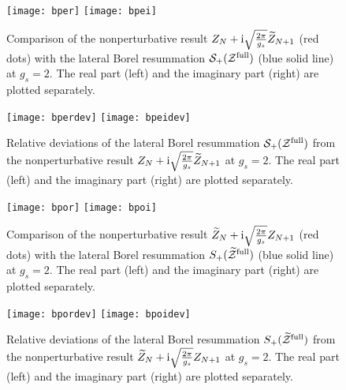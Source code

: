\documentclass[11pt]{article}
\newcommand{\ri}{{\rm i}}
\renewcommand{\[}{\begin{eqnarray}}
\renewcommand{\]}{\end{eqnarray}}
\newcommand{\tZ}{{\widetilde Z}}
\newcommand{\Zefull}{{\cal Z}^{\text{full}}}
\newcommand{\Zofull}{{\widetilde{\cal Z}}^{\text{full}}}
\begin{document}
\begin{figure}[tb]
\begin{center}
\texttt{[image: bper]}
\hspace{1cm}
\texttt{[image: bpei]}
\end{center}
\vspace{-2ex}
\caption{Comparison of the nonperturbative result
$Z_N+\ri\sqrt{\frac{2\pi}{g_s}}\tZ_{N+1}$ (red dots)
with the lateral Borel resummation
$\mathcal{S}_+(\Zefull)$ (blue solid line)
at $g_s=2$.
The real part (left) and the imaginary part (right)
are plotted separately.}
\label{fig:bpe}
\end{figure}
%
%
\begin{figure}[tb]
\vspace{2ex}
\begin{center}
\texttt{[image: bperdev]}
\hspace{1cm}
\texttt{[image: bpeidev]}
\end{center}
\vspace{-2ex}
\caption{Relative deviations of
the lateral Borel resummation
$\mathcal{S}_+(\Zefull)$
from the nonperturbative result
$Z_N+\ri\sqrt{\frac{2\pi}{g_s}}\tZ_{N+1}$
at $g_s=2$.
The real part (left) and the imaginary part (right)
are plotted separately.}
\label{fig:bpedev}
\end{figure}
%
%
\begin{figure}[tb]
\begin{center}
\texttt{[image: bpor]}
\hspace{1cm}
\texttt{[image: bpoi]}
\end{center}
\vspace{-2ex}
\caption{Comparison of the nonperturbative result
$\tZ_N+\ri\sqrt{\frac{2\pi}{g_s}}Z_{N+1}$ (red dots)
with the lateral Borel resummation
$S_+(\Zofull)$ (blue solid line)
at $g_s=2$.
The real part (left) and the imaginary part (right)
are plotted separately.}
\label{fig:bpo}
\end{figure}
%
%
\begin{figure}[tb]
\vspace{2ex}
\begin{center}
\texttt{[image: bpordev]}
\hspace{1cm}
\texttt{[image: bpoidev]}
\end{center}
\vspace{-2ex}
\caption{Relative deviations of
the lateral Borel resummation
$S_+(\Zofull)$
from the nonperturbative result
$\tZ_N+\ri\sqrt{\frac{2\pi}{g_s}}Z_{N+1}$
at $g_s=2$.
The real part (left) and the imaginary part (right)
are plotted separately.}
\label{fig:bpodev}
\end{figure}
%
\end{document}
